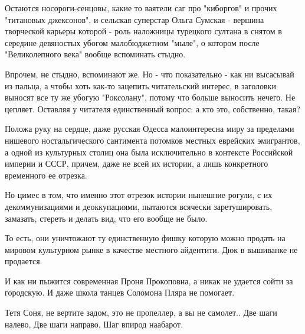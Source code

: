 Остаются носороги-сенцовы, какие то ваятели саг про "киборгов" и прочих
"титановых джексонов", и сельская суперстар Ольга Сумская - вершина творческой
карьеры которой - роль наложницы турецкого султана в снятом в середине
девяностых убогом малобюджетном "мыле", о котором после "Великолепного века"
вообще вспоминать стыдно. 

Впрочем, не стыдно, вспоминают же. Но - что показательно - как ни высасывай из
пальца, а чтобы хоть как-то зацепить  читательский интерес, в заголовки выносят
все ту же убогую "Роксолану", потому что больше выносить нечего. Не цепляет.
Оставляя у читателя единственный вопрос: а кто это, собственно, такая?

Положа руку на сердце, даже русская Одесса малоинтересна миру за пределами
нишевого ностальгического сантимента потомков местных еврейских эмигрантов, а
одной из культурных столиц она была исключительно в контексте Российской
империи и СССР, причем, даже не всей их истории, а лишь конкретного временного
ее отрезка. 

Но цимес в том, что именно этот отрезок истории нынешние рогули, с их
декоммунизациями и деоккупациями, пытаются всячески заретушировать, замазать,
стереть и делать вид, что его вообще не было. 

То есть, они уничтожают ту единственную фишку которую можно продать на мировом
культурном рынке в качестве местного айдентити. Дюк в вышиванке не продается.

И как ни пыжится современная Проня Прокоповна, а  никак не удается сойти за
городскую. И даже школа танцев Соломона Пляра не помогает. 

\obeycr
Тетя Соня, не вертите задом, 
это не пропеллер, а вы не самолет..
Две шаги налево, Две шаги направо,
Шаг впирод наабарот.
\restorecr
